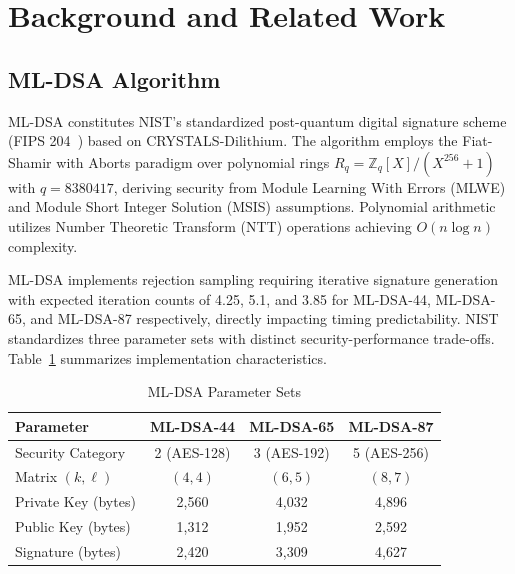 \documentclass[final, twoside]{IEEEtran} %
\begin{document}
\section{Background and Related Work}\label{sec:related}

\subsection{ML-DSA Algorithm}

ML-DSA constitutes NIST's standardized post-quantum digital signature scheme (FIPS 204~\cite{NIST-FIPS-204}) based on CRYSTALS-Dilithium. The algorithm employs the Fiat-Shamir with Aborts paradigm over polynomial rings $R_q = \mathbb{Z}_q[X]/(X^{256} + 1)$ with $q = 8380417$, deriving security from Module Learning With Errors (MLWE) and Module Short Integer Solution (MSIS) assumptions. Polynomial arithmetic utilizes Number Theoretic Transform (NTT) operations achieving $O(n \log n)$ complexity.

ML-DSA implements rejection sampling requiring iterative signature generation with expected iteration counts of 4.25, 5.1, and 3.85 for ML-DSA-44, ML-DSA-65, and ML-DSA-87 respectively, directly impacting timing predictability. NIST standardizes three parameter sets with distinct security-performance trade-offs. Table~\ref{tab:mldsa-params} summarizes implementation characteristics.

\begin{table}[h]
	\centering
	\caption{ML-DSA Parameter Sets}
	\label{tab:mldsa-params}
	\begin{tabular}{lccc}
		\toprule
		\textbf{Parameter}  & \textbf{ML-DSA-44} & \textbf{ML-DSA-65} & \textbf{ML-DSA-87} \\
		\midrule
		Security Category   & 2 (AES-128)        & 3 (AES-192)        & 5 (AES-256)        \\
		Matrix $(k,\ell)$   & $(4,4)$            & $(6,5)$            & $(8,7)$            \\
		Private Key (bytes) & 2,560              & 4,032              & 4,896              \\
		Public Key (bytes)  & 1,312              & 1,952              & 2,592              \\
		Signature (bytes)   & 2,420              & 3,309              & 4,627              \\
		\bottomrule
	\end{tabular}
\end{table}
\end{document}
